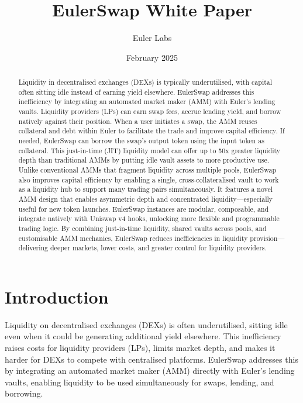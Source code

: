 \documentclass{article}
\title{EulerSwap White Paper}
\author{Euler Labs}
\date{February 2025}
\begin{document}
\maketitle

\pagestyle{plain}

\begin{abstract}
Liquidity in decentralised exchanges (DEXs) is typically underutilised, with capital often sitting idle instead of earning yield elsewhere. EulerSwap addresses this inefficiency by integrating an automated market maker (AMM) with Euler's lending vaults. Liquidity providers (LPs) can earn swap fees, accrue lending yield, and borrow natively against their position. When a user initiates a swap, the AMM reuses collateral and debt within Euler to facilitate the trade and improve capital efficiency. If needed, EulerSwap can borrow the swap’s output token using the input token as collateral. This just-in-time (JIT) liquidity model can offer up to 50x greater liquidity depth than traditional AMMs by putting idle vault assets to more productive use. Unlike conventional AMMs that fragment liquidity across multiple pools, EulerSwap also improves capital efficiency by enabling a single, cross-collateralised vault to work as a liquidity hub to support many trading pairs simultaneously. It features a novel AMM design that enables asymmetric depth and concentrated liquidity—especially useful for new token launches. EulerSwap instances are modular, composable, and integrate natively with Uniswap v4 hooks, unlocking more flexible and programmable trading logic. By combining just-in-time liquidity, shared vaults across pools, and customisable AMM mechanics, EulerSwap reduces inefficiencies in liquidity provision—delivering deeper markets, lower costs, and greater control for liquidity providers.
\end{abstract}

\section{Introduction}

Liquidity on decentralised exchanges (DEXs) is often underutilised, sitting idle even when it could be generating additional yield elsewhere. This inefficiency raises costs for liquidity providers (LPs), limits market depth, and makes it harder for DEXs to compete with centralised platforms. EulerSwap addresses this by integrating an automated market maker (AMM) directly with Euler’s lending vaults, enabling liquidity to be used simultaneously for swaps, lending, and borrowing.
\end{document}
